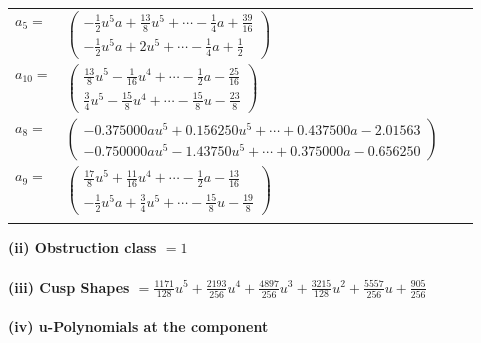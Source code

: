 \documentclass[1p]{elsarticle_modified}
\theoremstyle{definition}
\begin{document}
\begin{tabular}{m{7pt} m{180pt} m{7pt} m{180pt} }
\flushright $a_{5}=$&$\begin{pmatrix}-\frac{1}{2} u^5 a+\frac{13}{8} u^5+\cdots-\frac{1}{4} a+\frac{39}{16}\\-\frac{1}{2} u^5 a+2 u^5+\cdots-\frac{1}{4} a+\frac{1}{2}\end{pmatrix}$ \\
\flushright $a_{10}=$&$\begin{pmatrix}\frac{13}{8} u^5-\frac{1}{16} u^4+\cdots-\frac{1}{2} a-\frac{25}{16}\\\frac{3}{4} u^5-\frac{15}{8} u^4+\cdots-\frac{15}{8} u-\frac{23}{8}\end{pmatrix}$ \\
\flushright $a_{8}=$&$\begin{pmatrix}-0.375000 a u^{5}+0.156250 u^{5}+\cdots+0.437500 a-2.01563\\-0.750000 a u^{5}-1.43750 u^{5}+\cdots+0.375000 a-0.656250\end{pmatrix}$ \\
\flushright $a_{9}=$&$\begin{pmatrix}\frac{17}{8} u^5+\frac{11}{16} u^4+\cdots-\frac{1}{2} a-\frac{13}{16}\\-\frac{1}{2} u^5 a+\frac{3}{4} u^5+\cdots-\frac{15}{8} u-\frac{19}{8}\end{pmatrix}$\\&\end{tabular}
\flushleft \textbf{(ii) Obstruction class $= 1$}\\~\\
\flushleft \textbf{(iii) Cusp Shapes $= \frac{1171}{128} u^5+\frac{2193}{256} u^4+\frac{4897}{256} u^3+\frac{3215}{128} u^2+\frac{5557}{256} u+\frac{905}{256}$}\\~\\
\newpage\renewcommand{\arraystretch}{1}
\flushleft \textbf{(iv) u-Polynomials at the component}\newline \\
\end{document}
